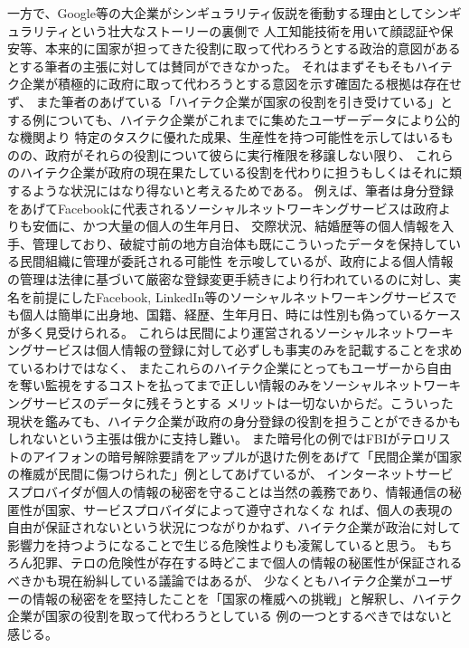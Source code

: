\documentclass[uplatex]{jsarticle}
\begin{document}
一方で、Google等の大企業がシンギュラリティ仮説を衝動する理由としてシンギュラリティという壮大なストーリーの裏側で
人工知能技術を用いて顔認証や保安等、本来的に国家が担ってきた役割に取って代わろうとする政治的意図があるとする筆者の主張に対しては賛同ができなかった。
それはまずそもそもハイテク企業が積極的に政府に取って代わろうとする意図を示す確固たる根拠は存在せず、
また筆者のあげている「ハイテク企業が国家の役割を引き受けている」とする例についても、ハイテク企業がこれまでに集めたユーザーデータにより公的な機関より
特定のタスクに優れた成果、生産性を持つ可能性を示してはいるものの、政府がそれらの役割について彼らに実行権限を移譲しない限り、
これらのハイテク企業が政府の現在果たしている役割を代わりに担うもしくはそれに類するような状況にはなり得ないと考えるためである。
例えば、筆者は身分登録をあげてFacebookに代表されるソーシャルネットワーキングサービスは政府よりも安価に、かつ大量の個人の生年月日、
交際状況、結婚歴等の個人情報を入手、管理しており、破綻寸前の地方自治体も既にこういったデータを保持している民間組織に管理が委託される可能性
を示唆しているが、政府による個人情報の管理は法律に基づいて厳密な登録変更手続きにより行われているのに対し、実名を前提にしたFacebook,
LinkedIn等のソーシャルネットワーキングサービスでも個人は簡単に出身地、国籍、経歴、生年月日、時には性別も偽っているケースが多く見受けられる。
これらは民間により運営されるソーシャルネットワーキングサービスは個人情報の登録に対して必ずしも事実のみを記載することを求めているわけではなく、
またこれらのハイテク企業にとってもユーザーから自由を奪い監視をするコストを払ってまで正しい情報のみをソーシャルネットワーキングサービスのデータに残そうとする
メリットは一切ないからだ。こういった現状を鑑みても、ハイテク企業が政府の身分登録の役割を担うことができるかもしれないという主張は俄かに支持し難い。
また暗号化の例ではFBIがテロリストのアイフォンの暗号解除要請をアップルが退けた例をあげて「民間企業が国家の権威が民間に傷つけられた」例としてあげているが、
インターネットサービスプロバイダが個人の情報の秘密を守ることは当然の義務であり、情報通信の秘匿性が国家、サービスプロバイダによって遵守されなくな
れば、個人の表現の自由が保証されないという状況につながりかねず、ハイテク企業が政治に対して影響力を持つようになることで生じる危険性よりも凌駕していると思う。
もちろん犯罪、テロの危険性が存在する時どこまで個人の情報の秘匿性が保証されるべきかも現在紛糾している議論ではあるが、
少なくともハイテク企業がユーザーの情報の秘密をを堅持したことを「国家の権威への挑戦」と解釈し、ハイテク企業が国家の役割を取って代わろうとしている
例の一つとするべきではないと感じる。
\end{document}
